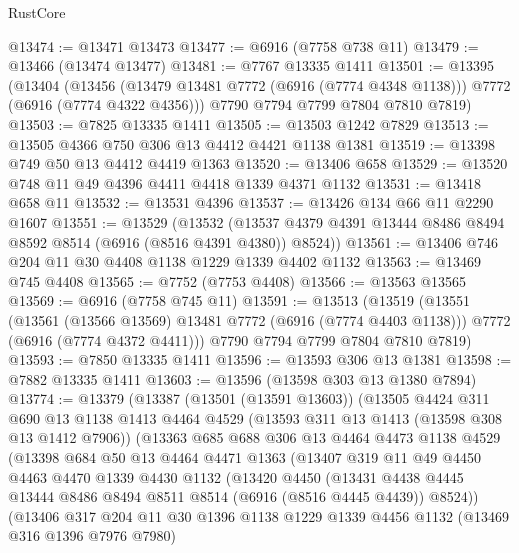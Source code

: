 \begin{lexlean}{RustCore}
\begin{coremodule}
@13474 := @13471 @13473
@13477 := @6916 (@7758 @738 @11)
@13479 := @13466 (@13474 @13477)
@13481 := @7767 @13335 @1411
@13501 := @13395
    (@13404
      (@13456 (@13479 @13481 @7772 (@6916 (@7774 @4348 @1138))) @7772 (@6916 (@7774 @4322 @4356)))
      @7790
      @7794
      @7799
      @7804
      @7810
      @7819)
@13503 := @7825 @13335 @1411
@13505 := @13503 @1242 @7829
@13513 := @13505 @4366 @750 @306 @13 @4412 @4421 @1138 @1381
@13519 := @13398 @749 @50 @13 @4412 @4419 @1363
@13520 := @13406 @658
@13529 := @13520 @748 @11 @49 @4396 @4411 @4418 @1339 @4371 @1132
@13531 := @13418 @658 @11
@13532 := @13531 @4396
@13537 := @13426 @134 @66 @11 @2290 @1607
@13551 := @13529
    (@13532 (@13537 @4379 @4391 @13444 @8486 @8494 @8592 @8514 (@6916 (@8516 @4391 @4380)) @8524))
@13561 := @13406 @746 @204 @11 @30 @4408 @1138 @1229 @1339 @4402 @1132
@13563 := @13469 @745 @4408
@13565 := @7752 (@7753 @4408)
@13566 := @13563 @13565
@13569 := @6916 (@7758 @745 @11)
@13591 := @13513
    (@13519
      (@13551
        (@13561 (@13566 @13569) @13481 @7772 (@6916 (@7774 @4403 @1138)))
        @7772
        (@6916 (@7774 @4372 @4411)))
      @7790
      @7794
      @7799
      @7804
      @7810
      @7819)
@13593 := @7850 @13335 @1411
@13596 := @13593 @306 @13 @1381
@13598 := @7882 @13335 @1411
@13603 := @13596 (@13598 @303 @13 @1380 @7894)
@13774 := @13379
    (@13387
      (@13501 (@13591 @13603))
      (@13505
        @4424
        @311
        @690
        @13
        @1138
        @1413
        @4464
        @4529
        (@13593 @311 @13 @1413 (@13598 @308 @13 @1412 @7906))
        (@13363
          @685
          @688
          @306
          @13
          @4464
          @4473
          @1138
          @4529
          (@13398
            @684
            @50
            @13
            @4464
            @4471
            @1363
            (@13407
              @319
              @11
              @49
              @4450
              @4463
              @4470
              @1339
              @4430
              @1132
              (@13420
                @4450
                (@13431
                  @4438
                  @4445
                  @13444
                  @8486
                  @8494
                  @8511
                  @8514
                  (@6916 (@8516 @4445 @4439))
                  @8524))
              (@13406
                @317
                @204
                @11
                @30
                @1396
                @1138
                @1229
                @1339
                @4456
                @1132
                (@13469 @316 @1396 @7976 @7980)

\end{coremodule}
\end{lexlean}
